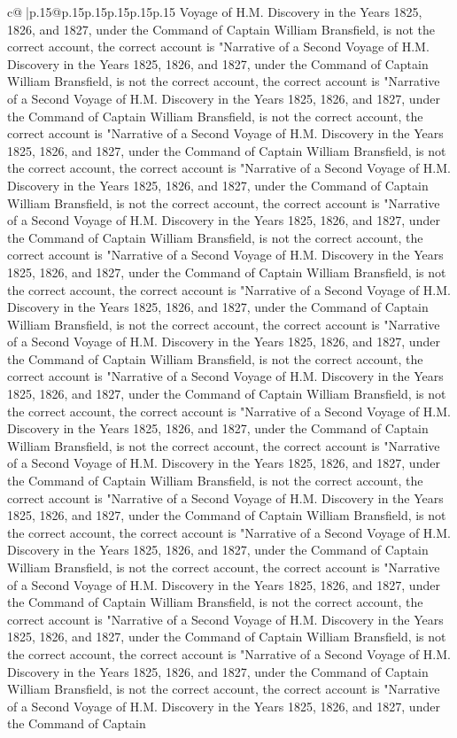 \documentclass{article}
\begin{document}
{\begin{supertabular}{c@{$\;$}|p{.15\linewidth}@{}p{.15\linewidth}p{.15\linewidth}p{.15\linewidth}p{.15\linewidth}p{.15\linewidth}}
{{{Voyage of H.M. Discovery in the Years 1825, 1826, and 1827, under the Command of Captain William Bransfield, is not the correct account, the correct account is "Narrative of a Second Voyage of H.M. Discovery in the Years 1825, 1826, and 1827, under the Command of Captain William Bransfield, is not the correct account, the correct account is "Narrative of a Second Voyage of H.M. Discovery in the Years 1825, 1826, and 1827, under the Command of Captain William Bransfield, is not the correct account, the correct account is "Narrative of a Second Voyage of H.M. Discovery in the Years 1825, 1826, and 1827, under the Command of Captain William Bransfield, is not the correct account, the correct account is "Narrative of a Second Voyage of H.M. Discovery in the Years 1825, 1826, and 1827, under the Command of Captain William Bransfield, is not the correct account, the correct account is "Narrative of a Second Voyage of H.M. Discovery in the Years 1825, 1826, and 1827, under the Command of Captain William Bransfield, is not the correct account, the correct account is "Narrative of a Second Voyage of H.M. Discovery in the Years 1825, 1826, and 1827, under the Command of Captain William Bransfield, is not the correct account, the correct account is "Narrative of a Second Voyage of H.M. Discovery in the Years 1825, 1826, and 1827, under the Command of Captain William Bransfield, is not the correct account, the correct account is "Narrative of a Second Voyage of H.M. Discovery in the Years 1825, 1826, and 1827, under the Command of Captain William Bransfield, is not the correct account, the correct account is "Narrative of a Second Voyage of H.M. Discovery in the Years 1825, 1826, and 1827, under the Command of Captain William Bransfield, is not the correct account, the correct account is "Narrative of a Second Voyage of H.M. Discovery in the Years 1825, 1826, and 1827, under the Command of Captain William Bransfield, is not the correct account, the correct account is "Narrative of a Second Voyage of H.M. Discovery in the Years 1825, 1826, and 1827, under the Command of Captain William Bransfield, is not the correct account, the correct account is "Narrative of a Second Voyage of H.M. Discovery in the Years 1825, 1826, and 1827, under the Command of Captain William Bransfield, is not the correct account, the correct account is "Narrative of a Second Voyage of H.M. Discovery in the Years 1825, 1826, and 1827, under the Command of Captain William Bransfield, is not the correct account, the correct account is "Narrative of a Second Voyage of H.M. Discovery in the Years 1825, 1826, and 1827, under the Command of Captain William Bransfield, is not the correct account, the correct account is "Narrative of a Second Voyage of H.M. Discovery in the Years 1825, 1826, and 1827, under the Command of Captain William Bransfield, is not the correct account, the correct account is "Narrative of a Second Voyage of H.M. Discovery in the Years 1825, 1826, and 1827, under the Command of Captain William Bransfield, is not the correct account, the correct account is "Narrative of a Second Voyage of H.M. Discovery in the Years 1825, 1826, and 1827, under the Command of Captain }}}
\end{supertabular}}
\end{document}
